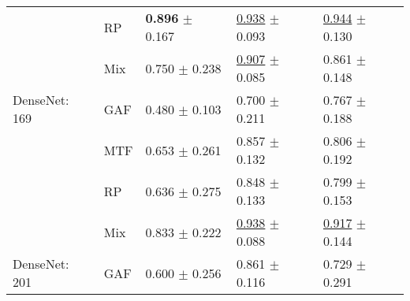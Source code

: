 \begin{tabular}[t]{lllll}
 & RP & \textbf{\textcolor[rgb]{0.0000000000,0.5000000000,0}{0.896}} $\pm$ \textcolor[rgb]{0.6087717266,0.3912282734,0}{0.167} & \underline{\textcolor[rgb]{0.0195694716,0.5000000000,0}{0.938}} $\pm$ \textcolor[rgb]{0.2275213798,0.5000000000,0}{0.093} & \underline{\textcolor[rgb]{0.1860465116,0.5000000000,0}{0.944}} $\pm$ \textcolor[rgb]{0.3698791733,0.5000000000,0}{0.130} \\
 & Mix & \textcolor[rgb]{0.3509571559,0.5000000000,0}{0.750} $\pm$ \textcolor[rgb]{0.8681986203,0.1318013797,0}{0.238} & \underline{\textcolor[rgb]{0.1467710372,0.5000000000,0}{0.907}} $\pm$ \textcolor[rgb]{0.1743396851,0.5000000000,0}{0.085} & \textcolor[rgb]{0.4651162791,0.5000000000,0}{0.861} $\pm$ \textcolor[rgb]{0.4217271436,0.5000000000,0}{0.148} \\
DenseNet: 169 & GAF & \textcolor[rgb]{1.0000000000,0.0000000000,0}{0.480} $\pm$ \textcolor[rgb]{0.3750153542,0.5000000000,0}{0.103} & \textcolor[rgb]{1.0000000000,0.0000000000,0}{0.700} $\pm$ \textcolor[rgb]{1.0000000000,0.0000000000,0}{0.211} & \textcolor[rgb]{0.7813953488,0.2186046512,0}{0.767} $\pm$ \textcolor[rgb]{0.5347281177,0.4652718823,0}{0.188} \\
 & MTF & \textcolor[rgb]{0.5849285931,0.4150714069,0}{0.653} $\pm$ \textcolor[rgb]{0.9495951119,0.0504048881,0}{0.261} & \textcolor[rgb]{0.3522504892,0.5000000000,0}{0.857} $\pm$ \textcolor[rgb]{0.4821490246,0.5000000000,0}{0.132} & \textcolor[rgb]{0.6511627907,0.3488372093,0}{0.806} $\pm$ \textcolor[rgb]{0.5486194730,0.4513805270,0}{0.192} \\
 & RP & \textcolor[rgb]{0.6244302644,0.3755697356,0}{0.636} $\pm$ \textcolor[rgb]{1.0000000000,0.0000000000,0}{0.275} & \textcolor[rgb]{0.3913894325,0.5000000000,0}{0.848} $\pm$ \textcolor[rgb]{0.4943543354,0.5000000000,0}{0.133} & \textcolor[rgb]{0.6744186047,0.3255813953,0}{0.799} $\pm$ \textcolor[rgb]{0.4351978611,0.5000000000,0}{0.153} \\
 & Mix & \textcolor[rgb]{0.1504102097,0.5000000000,0}{0.833} $\pm$ \textcolor[rgb]{0.8082489293,0.1917510707,0}{0.222} & \underline{\textcolor[rgb]{0.0213485145,0.5000000000,0}{0.938}} $\pm$ \textcolor[rgb]{0.1994619916,0.5000000000,0}{0.088} & \underline{\textcolor[rgb]{0.2790697674,0.5000000000,0}{0.917}} $\pm$ \textcolor[rgb]{0.4114646048,0.5000000000,0}{0.144} \\
DenseNet: 201 & GAF & \textcolor[rgb]{0.7119416591,0.2880583409,0}{0.600} $\pm$ \textcolor[rgb]{0.9318485438,0.0681514562,0}{0.256} & \textcolor[rgb]{0.3344600605,0.5000000000,0}{0.861} $\pm$ \textcolor[rgb]{0.3774431799,0.5000000000,0}{0.116} & \textcolor[rgb]{0.9069767442,0.0930232558,0}{0.729} $\pm$ \textcolor[rgb]{0.8299131753,0.1700868247,0}{0.291} \\

\end{tabular}

